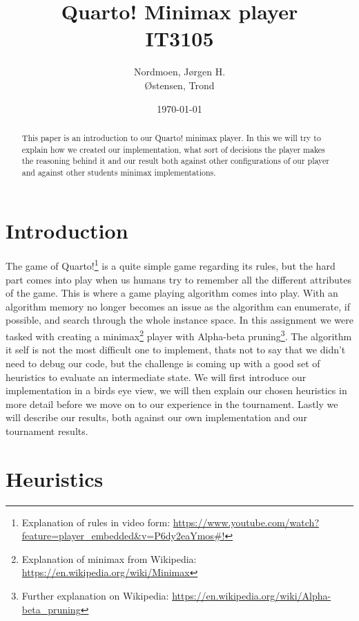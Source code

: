 \documentclass[titlepage, a4paper]{article}
\title{
	Quarto! Minimax player \\
	IT3105 \\
}
\author{
	Nordmoen, Jørgen H. \\
	Østensen, Trond
}
\date{\today}
\begin{document}
\maketitle

\begin{abstract}\label{abstract}
	This paper is an introduction to our Quarto! minimax player. In this we will try to
	explain how we created our implementation, what sort of decisions the player makes
	the reasoning behind it and our result both against other configurations of our player
	and against other students minimax implementations.
\end{abstract}

\newpage
\tableofcontents


\section{Introduction}\label{intro}
The game of Quarto!\footnote{Explanation of rules in video form: 
\url{https://www.youtube.com/watch?feature=player_embedded&v=P6dy2eaYmos#!}}
is a quite simple game regarding its rules, but the hard part
comes into play when us humans try to remember all the different attributes of the
game. This is where a game playing algorithm comes into play. With an algorithm
memory no longer becomes an issue as the algorithm can enumerate, if possible, and search
through the whole instance space. In this assignment
we were tasked with creating a minimax\footnote{Explanation of minimax from Wikipedia:
\url{https://en.wikipedia.org/wiki/Minimax}} player with Alpha-beta pruning\footnote{
Further explanation on Wikipedia: \url{https://en.wikipedia.org/wiki/Alpha-beta_pruning}}.
The algorithm it self is not the most difficult one to implement, thats not to say that
we didn't need to debug our code, but the challenge is coming up with a good set of
heuristics to evaluate an intermediate state. We will first introduce our implementation
in a birds eye view, we will then explain our chosen heuristics in more detail before
we move on to our experience in the tournament. Lastly we will describe our results, both
against our own implementation and our tournament results.

\section{Heuristics}\label{heuristics}
\end{document}
